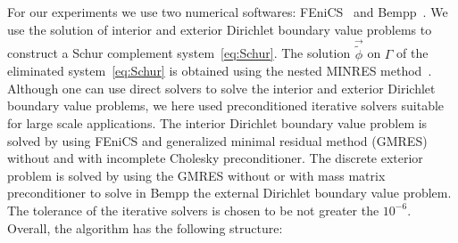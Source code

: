 For our experiments we use two numerical softwares: FEniCS~\cite{AlnaesBlechta2015a} and Bempp~\cite{SmigajEtAl2015}.
We use the solution of interior and exterior Dirichlet boundary value problems to construct a Schur complement system~\eqref{eq:Schur}.
The solution $\vec{\widetilde{\phi}}$ on $\Gamma$ of the eliminated system~\eqref{eq:Schur} is obtained using the nested MINRES method~\cite{}. Although one can use direct solvers to solve the interior and exterior Dirichlet boundary value problems, we here used preconditioned iterative solvers suitable for large scale applications.  The interior Dirichlet boundary value problem is solved by using FEniCS and generalized minimal residual method (GMRES)~\cite{MR848568} without and with incomplete Cholesky preconditioner. The discrete exterior problem is solved by using the GMRES without or with mass matrix preconditioner to solve in Bempp the external Dirichlet boundary value problem.
The tolerance of the iterative solvers is chosen to be not greater the $10^{-6}$. 
Overall, the algorithm has the following structure:
